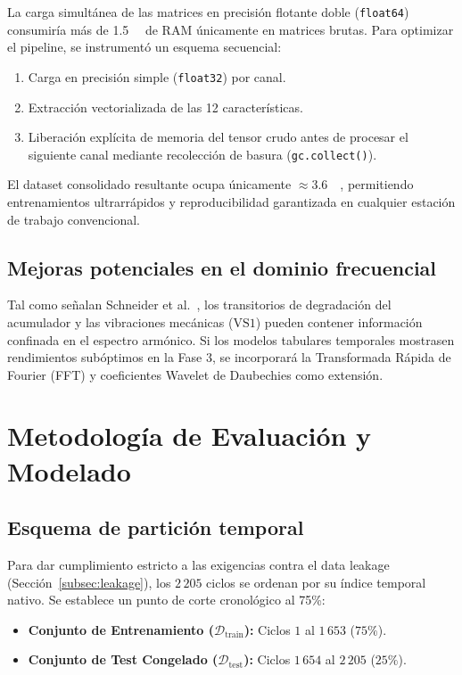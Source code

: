 \documentclass[journal]{IEEEtran}
\begin{document}
La carga simultánea de las matrices en precisión flotante doble (\texttt{float64}) consumiría más de \SI{1.5}{\giga\byte} de RAM únicamente en matrices brutas. Para optimizar el pipeline, se instrumentó un esquema secuencial:
\begin{enumerate}
    \item Carga en precisión simple (\texttt{float32}) por canal.
    \item Extracción vectorializada de las 12 características.
    \item Liberación explícita de memoria del tensor crudo antes de procesar el siguiente canal mediante recolección de basura (\texttt{gc.collect()}).
\end{enumerate}
El dataset consolidado resultante ocupa únicamente $\approx$\SI{3.6}{\mega\byte}, permitiendo entrenamientos ultrarrápidos y reproducibilidad garantizada en cualquier estación de trabajo convencional.

\subsection{Mejoras potenciales en el dominio frecuencial}

Tal como señalan Schneider et al.~\cite{Schneider2017}, los transitorios de degradación del acumulador y las vibraciones mecánicas ($\text{VS1}$) pueden contener información confinada en el espectro armónico. Si los modelos tabulares temporales mostrasen rendimientos subóptimos en la Fase 3, se incorporará la Transformada Rápida de Fourier (FFT) y coeficientes Wavelet de Daubechies como extensión.

\section{Metodología de Evaluación y Modelado}
\label{sec:metodologia}

\subsection{Esquema de partición temporal}
\label{subsec:split_metodo}

Para dar cumplimiento estricto a las exigencias contra el data leakage (Sección~\ref{subsec:leakage}), los $2\,205$ ciclos se ordenan por su índice temporal nativo. Se establece un punto de corte cronológico al 75\%:
\begin{itemize}[leftmargin=*]
    \item \textbf{Conjunto de Entrenamiento ($\mathcal{D}_{\text{train}}$):} Ciclos $1$ al $1\,653$ ($75\%$).
    \item \textbf{Conjunto de Test Congelado ($\mathcal{D}_{\text{test}}$):} Ciclos $1\,654$ al $2\,205$ ($25\%$).
\end{itemize}
\end{document}
